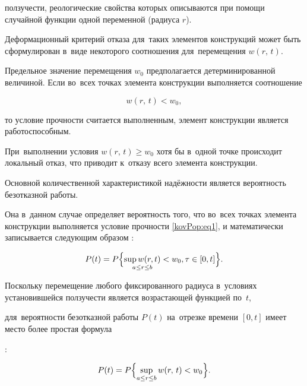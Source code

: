 ползучести, реологические свойства которых описываются при помощи случайной функции одной переменной (радиуса $r$).



Деформационный критерий отказа для~таких элементов конструкций может быть сформулирован в~виде некоторого соотношения для~перемещения $w(r,\,t)$. 

Предельное значение перемещения $w_0$ предполагается детерминированной величиной. Если во~всех точках элемента конструкции выполняется соотношение 

\begin{equation}

\label{kovPop:eq1} w(r,\,t) < w_0,

\end{equation}

то условие прочности считается выполненным, элемент конструкции является работоспособным. 

При~выполнении условия $w(r,\,t) \ge w_0$ хотя бы в~одной точке происходит локальный отказ, что приводит к~отказу всего элемента конструкции.



Основной количественной характеристикой надёжности является вероятность безотказной работы. 

Она в~данном случае определяет вероятность того, что во~всех точках элемента конструкции выполняется условие прочности \eqref{kovPop:eq1}, и математически записывается следующим образом \cite{KovalPopov:Bolotin}:

\begin{equation}

\label{kovPop:eq2} P(t) = P\Bigl\{\mathop {\sup w(r,t)}\limits_{a

\le r \le b} < w_0, \tau \in [0, t]\Bigr\}.

\end{equation}



Поскольку перемещение любого фиксированного радиуса в~условиях установившейся ползучести является возрастающей функцией по~$t$,

для~вероятности безотказной работы $P(t)$ на~отрезке времени $[0, t]$ имеет место более простая формула

\cite{KovalPopov:Bolotin}:

\begin{equation}

\label{kovPop:eq3} P(t) = P\Bigl\{ {\mathop {\sup }\limits_{a \le

r \le b} w(r,\,t) < w_0 } \Bigr\}.

\end{equation}



